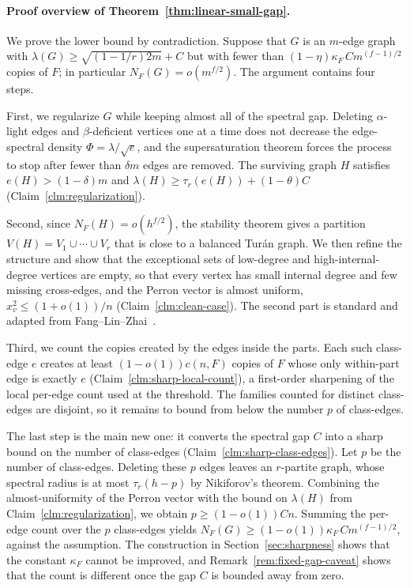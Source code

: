 \documentclass[11pt,a4paper]{article}
\theoremstyle{definition}
\theoremstyle{plain}
\newcommand{\Ksharp}{\kappa_{F}}
\renewcommand{\le}{\leqslant}
\renewcommand{\ge}{\geqslant}
\begin{document}
\paragraph{Proof overview of Theorem~\ref{thm:linear-small-gap}.}
We prove the lower bound by contradiction. 
Suppose that $G$ is an $m$-edge graph with
$\lambda(G)\ge\sqrt{(1-1/r)2m}+C$ but with fewer than $(1-\eta)\Ksharp\,Cm^{(f-1)/2}$ copies
of $F$; in particular $ N_F (G)=o(m^{f/2})$. The argument 
contains four steps.

First, we regularize $G$ while keeping almost all of the spectral gap. Deleting
$\alpha$-light edges and $\beta$-deficient vertices one at a time does not decrease the
edge-spectral density $\Phi=\lambda/\sqrt{e}$, and the supersaturation theorem forces the
process to stop after fewer than $\delta m$ edges are removed. The surviving graph $H$
satisfies $e(H)>(1-\delta)m$ and 
$\lambda(H)\ge\tau_r(e(H))+(1-\theta)C$ (Claim~\ref{clm:regularization}). 

Second, since $ N_F (H)=o(h^{f/2})$, the stability theorem gives a partition
$V(H)=V_1\cup\cdots\cup V_r$ that is close to a balanced Tur\'an graph. We then refine the 
structure and show that 
the exceptional sets of low-degree and
high-internal-degree vertices are empty, so that  every vertex has small
internal degree and few missing cross-edges, and the Perron vector is almost uniform,
$x_v^2\le(1+o(1))/n$ (Claim~\ref{clm:clean-case}). 
The second part is standard and adapted from Fang--Lin--Zhai~\cite{FLZ}. 

Third, we count the copies created by the edges inside the parts. Each such class-edge
$e$ creates at least $(1-o(1))c(n,F)$ copies of $F$ whose only within-part edge is exactly $e$
(Claim~\ref{clm:sharp-local-count}), a first-order sharpening of the local per-edge count used at
the threshold. The families counted for distinct class-edges are disjoint, so it remains
to bound from below the number $p$ of class-edges.

The last step is the main new one: 
it converts the spectral gap $C$ into a sharp bound on the  number of class-edges (Claim~\ref{clm:sharp-class-edges}). Let $p$ be the number of class-edges. 
Deleting these $p$ edges leaves an
$r$-partite graph, whose spectral radius is at most $\tau_r(h-p)$ by Nikiforov's theorem. 
Combining the almost-uniformity of the 
Perron vector with   
 the bound on $\lambda(H)$ from  Claim~\ref{clm:regularization}, 
 we obtain $p\ge(1-o(1))Cn$. Summing the
per-edge count over the $p$ class-edges yields
$N_F(G)\ge(1-o(1))\Ksharp\,Cm^{(f-1)/2}$, against the assumption. The construction in
Section~\ref{sec:sharpness} shows that the constant $\Ksharp$ cannot be improved, 
and Remark~\ref{rem:fixed-gap-caveat} shows that
the count is different once the gap $C$ is bounded away from zero.
\end{document}
